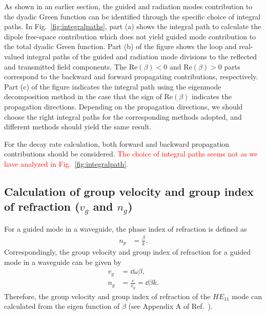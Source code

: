 \documentclass[]{report}
\begin{document}
As shown in an earlier section, the guided and radiation modes contribution to the dyadic Green function can be identified through the specific choice of integral paths. In Fig.~\ref{fig:integralpaths}, part (a) shows the integral path to calculate the dipole free-space contribution which does not yield guided mode contribution to the total dyadic Green function. Part (b) of the figure shows the loop and real-valued integral paths of the guided and radiation mode divisions to the reflected and transmitted field components. The $ \mathrm{Re}(\beta)<0 $ and $ \mathrm{Re}(\beta)>0 $ parts correspond to the backward and forward propagating contributions, respectively. Part (c) of the figure indicates the integral path using the eigenmode decomposition method in the case that the sign of $ \mathrm{Re}(\beta) $ indicates the propagation directions. Depending on the propagation directions, we should choose the right integral paths for the corresponding methods adopted, and different methods should yield the same result. 

For the decay rate calculation, both forward and backward propagation contributions should be considered. \textcolor{red}{The choice of integral paths seems not as we have analyzed in Fig.~\ref{fig:integralpath}.} 


\subsection{Calculation of group velocity and group index of refraction ($ v_g $ and $ n_g $)}
For a guided mode in a waveguide, the phase index of refraction is defined as
\begin{align}
n_p &= \frac{\beta}{k}.
\end{align}
Correspondingly, the group velocity and group index of refraction for a guided mode in a waveguide can be given by
\begin{align}
v_g &= \dd{\omega}{\beta},\\
n_g &= \frac{c}{v_g}=\dd{\beta}{k}.
\end{align}
Therefore, the group velocity and group index of refraction of the $ HE_{11} $ mode can calculated from the eigen function of $ \beta $ (see Appendix A of Ref.~\cite{LeKien2005}). 
\end{document}
